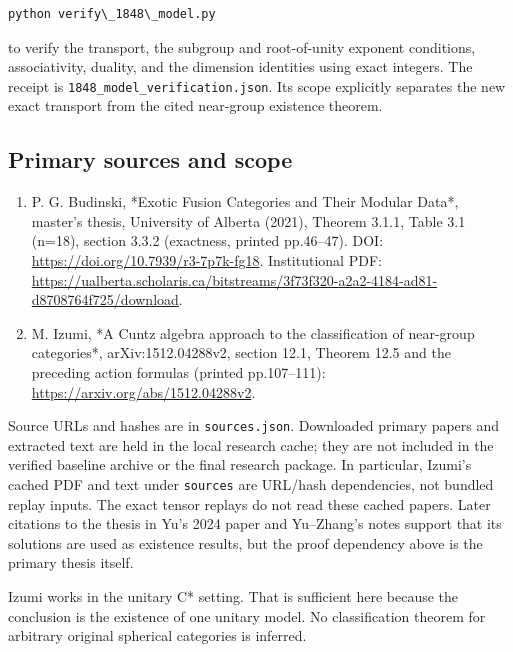 \begin{verbatim}
python verify\_1848\_model.py
\end{verbatim}

to verify the transport, the subgroup and root-of-unity exponent
conditions, associativity, duality, and the dimension identities using
exact integers. The receipt is
\texttt{1848\_\allowbreak{}model\_\allowbreak{}verifi\allowbreak{}cation\allowbreak{}.\allowbreak{}json}.
Its scope explicitly separates the new exact transport from the cited
near-group existence theorem.

\hypertarget{primary-sources-and-scope}{%
\subsection{Primary sources and scope}\label{primary-sources-and-scope}}

\begin{enumerate}
\def\labelenumi{\arabic{enumi}.}
\tightlist
\item
  P. G. Budinski, *Exotic Fusion Categories and Their Modular Data*,
  master's thesis, University of Alberta (2021), Theorem 3.1.1, Table
  3.1 (n=18), section 3.3.2 (exactness, printed pp.46--47). DOI:
  \url{https://doi.org/10.7939/r3-7p7k-fg18}. Institutional PDF:
  \url{https://ualberta.scholaris.ca/bitstreams/3f73f320-a2a2-4184-ad81-d8708764f725/download}.
\item
  M. Izumi, *A Cuntz algebra approach to the classification of
  near-group categories*, arXiv:1512.04288v2, section 12.1, Theorem 12.5
  and the preceding action formulas (printed pp.107--111):
  \url{https://arxiv.org/abs/1512.04288v2}.
\end{enumerate}

Source URLs and hashes are in
\texttt{source\allowbreak{}s.\allowbreak{}json}. Downloaded primary
papers and extracted text are held in the local research cache; they are
not included in the verified baseline archive or the final research
package. In particular, Izumi's cached PDF and text under
\texttt{source\allowbreak{}s} are URL/hash dependencies, not bundled
replay inputs. The exact tensor replays do not read these cached papers.
Later citations to the thesis in Yu's 2024 paper and Yu--Zhang's notes
support that its solutions are used as existence results, but the proof
dependency above is the primary thesis itself.

Izumi works in the unitary C* setting. That is sufficient here because
the conclusion is the existence of one unitary model. No classification
theorem for arbitrary original spherical categories is inferred.
